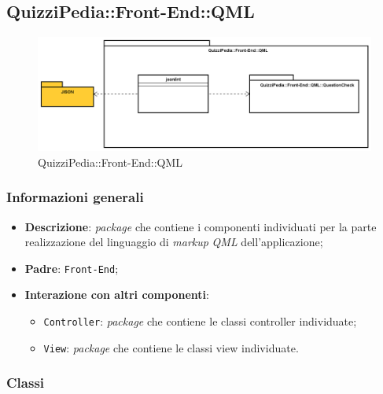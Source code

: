 \newpage
\subsection{QuizziPedia::Front-End::QML}


\begin{figure} [ht]
	\centering
	\includegraphics[scale=0.42]{UML/Package/QuizziPedia_Front-End_QML.png}
	\caption{QuizziPedia::Front-End::QML}
\end{figure} \FloatBarrier

\subsubsection{Informazioni generali}
\begin{itemize}
	\item \textbf{Descrizione}: \textit{package} che contiene i componenti individuati per la parte realizzazione del linguaggio di \textit{markup} \textit{QML} dell'applicazione;
	\item \textbf{Padre}: \texttt{Front-End};
	\item \textbf{Interazione con altri componenti}:
	\begin{itemize}
		\item \texttt{Controller}: \textit{package} che contiene le classi controller individuate;
		\item \texttt{View}: \textit{package} che contiene le classi view individuate.
	\end{itemize} 
\end{itemize}
\subsubsection{Classi}



